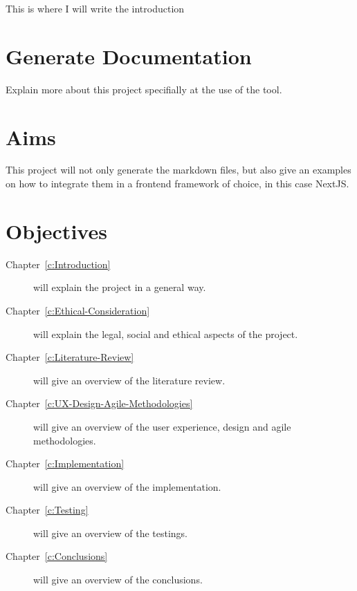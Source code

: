 This is where I will write the introduction

\section{Generate Documentation}
\label{s:Generate-Documentation}

Explain more about this project specifially at the use of the tool.

\section{Aims}
\label{s:Aim}

This project will not only generate the markdown files, but also give an examples on how to integrate them in a frontend framework of choice, in this case NextJS\@.

\section{Objectives}
\label{s:Objectives}

\begin{description}

  \item[Chapter~\ref{c:Introduction}] will explain the project in a general way.

  \item[Chapter~\ref{c:Ethical-Consideration}] will explain the legal, social and ethical aspects of the project.

  \item[Chapter~\ref{c:Literature-Review}] will give an overview of the literature review.

  \item[Chapter~\ref{c:UX-Design-Agile-Methodologies}] will give an overview of the user experience, design and agile methodologies.

  \item[Chapter~\ref{c:Implementation}] will give an overview of the implementation.

  \item[Chapter~\ref{c:Testing}] will give an overview of the testings.

  \item[Chapter~\ref{c:Conclusions}] will give an overview of the conclusions.

\end{description}



